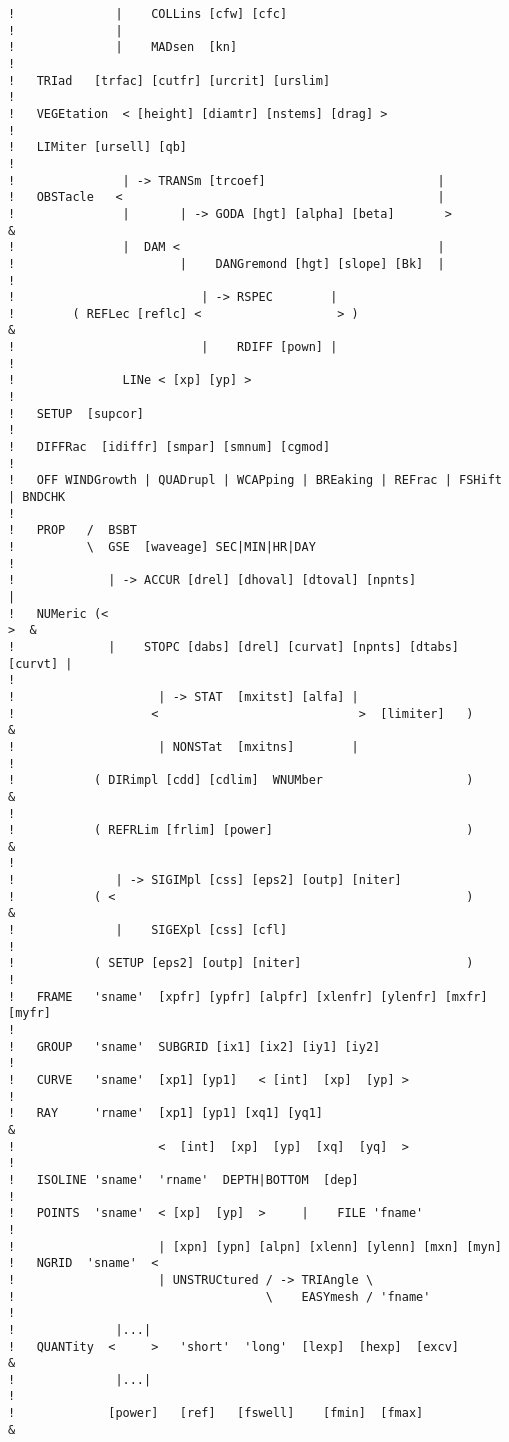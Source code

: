 \documentclass[12pt]{book}
\begin{document}
\begin{verbatim}
!              |    COLLins [cfw] [cfc]
!              |
!              |    MADsen  [kn]
!
!   TRIad   [trfac] [cutfr] [urcrit] [urslim]
!
!   VEGEtation  < [height] [diamtr] [nstems] [drag] >
!
!   LIMiter [ursell] [qb]
!
!               | -> TRANSm [trcoef]                        |
!   OBSTacle   <                                            |
!               |       | -> GODA [hgt] [alpha] [beta]       >              &
!               |  DAM <                                    |
!                       |    DANGremond [hgt] [slope] [Bk]  |
!
!                          | -> RSPEC        |
!        ( REFLec [reflc] <                   > )                           &
!                          |    RDIFF [pown] |
!
!               LINe < [xp] [yp] >
!
!   SETUP  [supcor]
!
!   DIFFRac  [idiffr] [smpar] [smnum] [cgmod]
!
!   OFF WINDGrowth | QUADrupl | WCAPping | BREaking | REFrac | FSHift | BNDCHK
!
!   PROP   /  BSBT
!          \  GSE  [waveage] SEC|MIN|HR|DAY
!
!             | -> ACCUR [drel] [dhoval] [dtoval] [npnts]               |
!   NUMeric (<                                                           >  &
!             |    STOPC [dabs] [drel] [curvat] [npnts] [dtabs] [curvt] |
!
!                    | -> STAT  [mxitst] [alfa] |
!                   <                            >  [limiter]   )           &
!                    | NONSTat  [mxitns]        |
!
!           ( DIRimpl [cdd] [cdlim]  WNUMber                    )           &
!
!           ( REFRLim [frlim] [power]                           )           &
!
!              | -> SIGIMpl [css] [eps2] [outp] [niter]
!           ( <                                                 )           &
!              |    SIGEXpl [css] [cfl]
!
!           ( SETUP [eps2] [outp] [niter]                       )
!
!   FRAME   'sname'  [xpfr] [ypfr] [alpfr] [xlenfr] [ylenfr] [mxfr] [myfr]
!
!   GROUP   'sname'  SUBGRID [ix1] [ix2] [iy1] [iy2]
!
!   CURVE   'sname'  [xp1] [yp1]   < [int]  [xp]  [yp] >
!
!   RAY     'rname'  [xp1] [yp1] [xq1] [yq1]                                &
!                    <  [int]  [xp]  [yp]  [xq]  [yq]  >
!
!   ISOLINE 'sname'  'rname'  DEPTH|BOTTOM  [dep]
!
!   POINTS  'sname'  < [xp]  [yp]  >     |    FILE 'fname'
!
!                    | [xpn] [ypn] [alpn] [xlenn] [ylenn] [mxn] [myn]
!   NGRID  'sname'  <
!                    | UNSTRUCtured / -> TRIAngle \
!                                   \    EASYmesh / 'fname'
!
!              |...|
!   QUANTity  <     >   'short'  'long'  [lexp]  [hexp]  [excv]             &
!              |...|
!
!             [power]   [ref]   [fswell]    [fmin]  [fmax]                  &

\end{verbatim}
\end{document}
